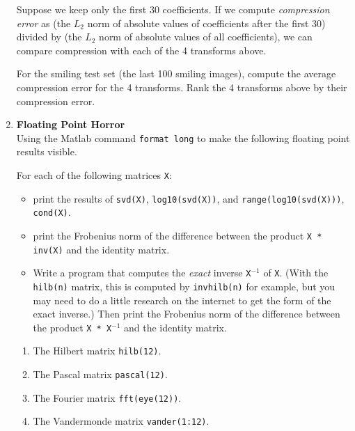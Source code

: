 \documentclass[10pt]{article}
\begin{document}
\begin{enumerate}
Suppose we keep only the first 30 coefficients.
If we compute \emph{compression error}
as (the $L_2$ norm of absolute values of coefficients after the first 30) divided by
(the $L_2$ norm of absolute values of all coefficients),
we can compare compression with each of the 4 transforms above.

For the smiling test set (the last 100 smiling images),
compute the average compression error for the 4 transforms.
Rank the 4 transforms above by their compression error.

\item {\bf Floating Point Horror} \\
Using the Matlab command \verb"format long" to make the following floating point results visible.

For each of the following matrices \verb"X":
\begin{itemize}
\item
print the results of \verb"svd(X)", \verb"log10(svd(X))", and \verb"range(log10(svd(X)))", \verb"cond(X)". 
\item
print the Frobenius norm of the difference between the product \verb"X * inv(X)" and the identity matrix.
\item
Write a program that computes the \emph{exact} inverse \verb"X"${}^{-1}$ of \verb"X".
(With the \verb"hilb(n)" matrix, this is computed by \verb"invhilb(n)" for example,
but you may need to do a little research on the internet to get the form of the exact inverse.)
Then print the Frobenius norm of the difference between the product \verb"X * X"${}^{-1}$ and the identity matrix.
\end{itemize}
\begin{enumerate}
\item The Hilbert matrix \verb"hilb(12)".
\item The Pascal matrix \verb"pascal(12)".
\item The Fourier matrix \verb"fft(eye(12))".
\item The Vandermonde matrix \verb"vander(1:12)".
\end{enumerate}

\end{enumerate}
\end{document}
